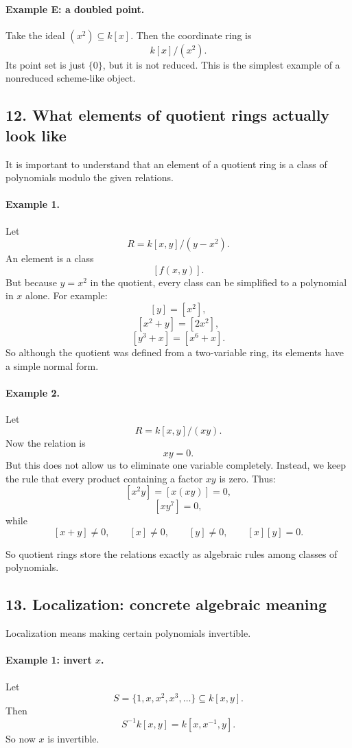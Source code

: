 \documentclass[12pt,a4paper]{article}
\theoremstyle{plain}
\theoremstyle{definition}      %
\begin{document}
	\paragraph{Example E: a doubled point.}
	Take the ideal \((x^2)\subseteq k[x]\). Then the coordinate ring is
	\[
	k[x]/(x^2).
	\]
	Its point set is just \(\{0\}\), but it is not reduced. This is the simplest example of a nonreduced scheme-like object.
	
	\subsection*{12. What elements of quotient rings actually look like}
	
	It is important to understand that an element of a quotient ring is a class of polynomials modulo the given relations.
	
	\paragraph{Example 1.}
	Let
	\[
	R=k[x,y]/(y-x^2).
	\]
	An element is a class
	\[
	[f(x,y)].
	\]
	But because \(y=x^2\) in the quotient, every class can be simplified to a polynomial in \(x\) alone. For example:
	\[
	[y]=[x^2],
	\]
	\[
	[x^2+y]=[2x^2],
	\]
	\[
	[y^3+x]=[x^6+x].
	\]
	So although the quotient was defined from a two-variable ring, its elements have a simple normal form.
	
	\paragraph{Example 2.}
	Let
	\[
	R=k[x,y]/(xy).
	\]
	Now the relation is
	\[
	xy=0.
	\]
	But this does not allow us to eliminate one variable completely. Instead, we keep the rule that every product containing a factor \(xy\) is zero. Thus:
	\[
	[x^2y]=[x(xy)]=0,
	\]
	\[
	[xy^7]=0,
	\]
	while
	\[
	[x+y]\neq 0,\qquad [x]\neq 0,\qquad [y]\neq 0,\qquad [x][y]=0.
	\]
	
	So quotient rings store the relations exactly as algebraic rules among classes of polynomials.
	
	\subsection*{13. Localization: concrete algebraic meaning}
	
	Localization means making certain polynomials invertible.
	
	\paragraph{Example 1: invert \(x\).}
	Let
	\[
	S=\{1,x,x^2,x^3,\dots\}\subseteq k[x,y].
	\]
	Then
	\[
	S^{-1}k[x,y]=k[x,x^{-1},y].
	\]
	So now \(x\) is invertible.
	
\end{document}
